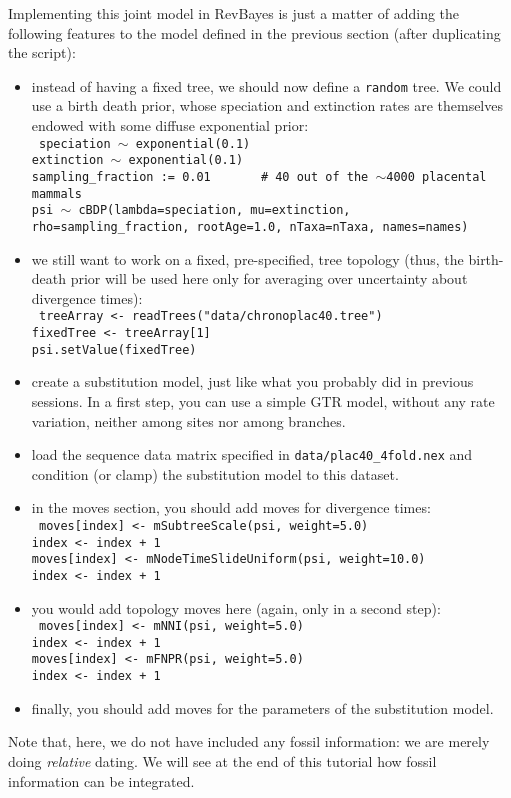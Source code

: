 \documentclass[usletter]{article}
\newcommand{\cmd}[1]{\texttt{#1}}
\begin{document}
Implementing this joint model in RevBayes is just a matter of
adding the following features to the model defined in the previous section
(after duplicating the script):
\begin{itemize}
\item
instead of having a fixed tree, we should now define a \cmd{random} tree. We could use a birth death prior, whose speciation and extinction rates are themselves endowed with some diffuse exponential prior:
\\
\cmd{
speciation $\sim$ exponential(0.1)
\\
extinction $\sim$ exponential(0.1)
\\
sampling\_fraction := 0.01  \, \, \,    \# 40 out of the $\sim$4000 placental mammals
\\
psi $\sim$ cBDP(lambda=speciation, mu=extinction, rho=sampling\_fraction, rootAge=1.0, nTaxa=nTaxa, names=names)
}
\item
we still want to work on a fixed, pre-specified, tree topology (thus, the birth-death prior will be used here only for averaging over uncertainty about divergence times):
\\
\cmd{
treeArray <- readTrees("data/chronoplac40.tree")
\\
fixedTree <- treeArray[1]
\\
psi.setValue(fixedTree)
}
\item
create a substitution model, just like what you probably did in previous sessions. In a first step, you can use a simple GTR model, without any rate variation, neither among sites nor among branches.
\item
load the sequence data matrix specified in \cmd{data/plac40\_4fold.nex} and condition (or clamp) the substitution model to this dataset.
\item
in the moves section, you should add moves for divergence times:
\\
\cmd{
moves[index] <- mSubtreeScale(psi, weight=5.0)
\\
index <- index + 1
\\
moves[index] <- mNodeTimeSlideUniform(psi, weight=10.0)
\\
index <- index + 1
}
\item
you would add topology moves here (again, only in a second step):
\\
\cmd{
moves[index] <- mNNI(psi, weight=5.0)
\\
index <- index + 1
\\
moves[index] <- mFNPR(psi, weight=5.0)
\\
index <- index + 1
}
\item
finally, you should add moves for the parameters of the substitution model.
\end{itemize}
Note that, here, we do not have included any fossil information: we are merely doing \emph{relative} dating. We will see at the end of this tutorial how fossil information can be integrated.
\end{document}
